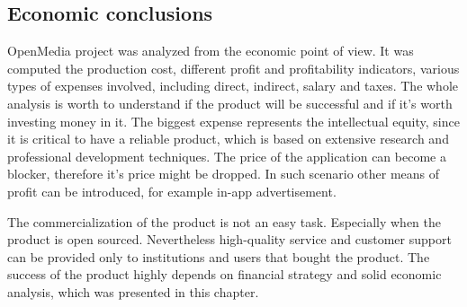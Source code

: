 \subsection{Economic conclusions}
OpenMedia project was analyzed from the economic point of view. It was computed the production cost, different profit and profitability indicators, various types of expenses involved, including direct, indirect, salary and taxes. The whole analysis is worth to understand if the product will be successful and if it's worth investing money in it. The biggest expense represents the intellectual equity, since it is critical to have a reliable product, which is based on extensive research and professional development techniques. The price of the application can become a blocker, therefore it's price might be dropped. In such scenario other means
of profit can be introduced, for example in-app advertisement.

The commercialization of the product is not an easy task. Especially when the product is open sourced. Nevertheless high-quality service and customer support can be provided only to institutions and users that bought the product. The success of the product highly depends on financial strategy and solid economic analysis, which was presented in this chapter.
\clearpage